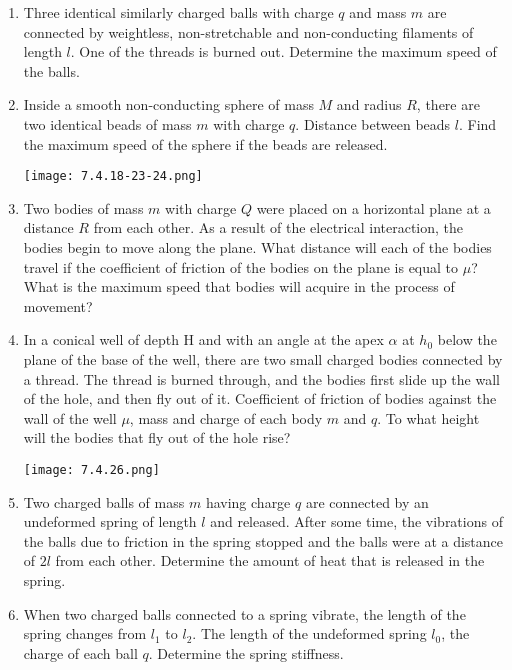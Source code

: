 \documentclass{article}
\begin{document}
\begin{enumerate}[label=7.4.\arabic*]
\item Three identical similarly charged balls with charge $q$ and mass $m$ are connected by weightless, non-stretchable and non-conducting filaments of length $l$. One of the threads is burned out. Determine the maximum speed of the balls.

\item Inside a smooth non-conducting sphere of mass $M$ and radius $R$, there are two identical beads of mass $m$ with charge $q$. Distance between beads $l$. Find the maximum speed of the sphere if the beads are released.

\begin{center}
    \texttt{[image: 7.4.18-23-24.png]}
\end{center}



\item Two bodies of mass $m$ with charge $Q$ were placed on a horizontal plane at a distance $R$ from each other. As a result of the electrical interaction, the bodies begin to move along the plane. What distance will each of the bodies travel if the coefficient of friction of the bodies on the plane is equal to $\mu$? What is the maximum speed that bodies will acquire in the process of movement?

\item In a conical well of depth H and with an angle at the apex $\alpha$ at $h_0$ below the plane of the base of the well, there are two small charged bodies connected by a thread. The thread is burned through, and the bodies first slide up the wall of the hole, and then fly out of it. Coefficient of friction of bodies against the wall of the well $\mu$, mass and charge of each body $m$ and $q$. To what height will the bodies that fly out of the hole rise?

\begin{center}
    \texttt{[image: 7.4.26.png]}
\end{center}


\item Two charged balls of mass $m$ having charge $q$ are connected by an undeformed spring of length $l$ and released. After some time, the vibrations of the balls due to friction in the spring stopped and the balls were at a distance of $2l$ from each other. Determine the amount of heat that is released in the spring.

\item When two charged balls connected to a spring vibrate, the length of the spring changes from $l_1$ to $l_2$. The length of the undeformed spring $l_0$, the charge of each ball $q$. Determine the spring stiffness.


\end{enumerate}
\end{document}
